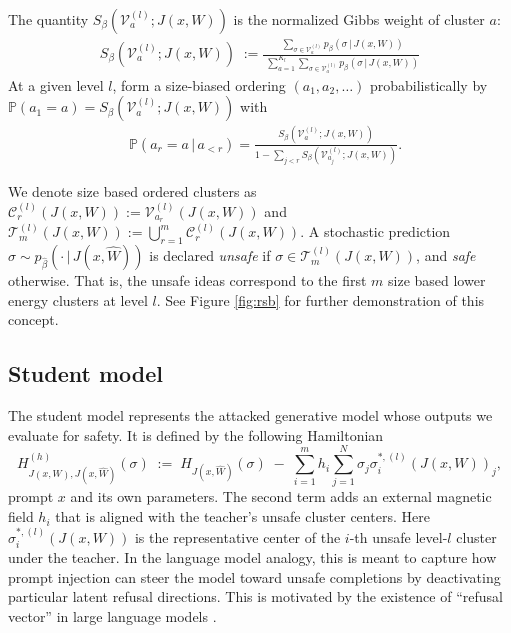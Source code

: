\documentclass{article}
\theoremstyle{remark} %
\begin{document}
The quantity \(S_\beta(\mathcal V^{(l)}_a;J(x,W))\) is the normalized Gibbs weight of cluster \(a\):
\begin{equation}
\begin{aligned}    
 S_{\beta}(\mathcal{V}^{(l)}_a;J(x, W))\;:=\frac{\;\sum_{\sigma\in\mathcal{V}^{(l)}_a} p_\beta(\sigma\,|\,J(x, W))}{\;\sum_{a=1}^{K_l}\sum_{\sigma\in\mathcal{V}^{(l)}_a} p_\beta(\sigma\,|\,J(x, W))}
\end{aligned}
\end{equation}
At a given level $l$, form a size-biased ordering $(a_1,a_2,\ldots)$ probabilistically by $ \mathbb{P}(a_1=a)=S_\beta(\mathcal V^{(l)}_a;J(x, W))$ with
\begin{equation}
\begin{aligned}     &\mathbb{P}(a_r=a\,|\,a_{<r})=\frac{S_\beta(\mathcal V^{(l)}_a;J(x, W))}{1-\sum_{j<r}S_\beta(\mathcal V^{(l)}_{a_j};J(x, W))}.
\end{aligned}
\end{equation}


We denote size based ordered clusters as $\mathcal C^{(l)}_r(J(x, W)):=\mathcal V^{(l)}_{a_r}(J(x, W))$ and 
$\mathcal T^{(l)}_m(J(x, W)):=\bigcup_{r=1}^m \mathcal C^{(l)}_r(J(x, W))$.
 A stochastic prediction $\sigma\sim p_{\hat \beta}(\cdot\,|\,J(x,\hat W))$ is declared \emph{unsafe} if $\sigma\in \mathcal{T}^{(l)}_m(J(x, W))$, and \emph{safe} otherwise. 
 That is, the unsafe ideas correspond to the first $m$ size based lower energy clusters at level $l$. 
 See Figure \ref{fig:rsb} for further demonstration of this concept.



\subsection{Student model}

The student model represents the attacked generative model whose outputs we
evaluate for safety. 
It is defined by the following Hamiltonian
\begin{equation}
H^{(h)}_{J(x,W), J(x,\hat W)}(\sigma)\;:=\;H_{J(x,\hat W)}(\sigma)\;-\;\sum_{i=1}^m h_i\sum_{j=1}^N\sigma_j\sigma^{\ast,(l)}_i(J(x,W))_j,
\end{equation}
prompt \(x\) and its own parameters. 
The second term adds an external magnetic field $h_i$ that is aligned with the teacher's unsafe cluster centers. 
Here \(\sigma^{\ast,(l)}_i(J(x,W))\) is the representative center of the \(i\)-th unsafe level-\(l\)
cluster under the teacher. 
In the language model analogy, this is meant to capture how prompt injection can steer the model
toward unsafe completions by deactivating particular latent refusal directions. This is motivated by the existence of “refusal vector” in large language models \citep{arditi2024refusal}.
\end{document}
